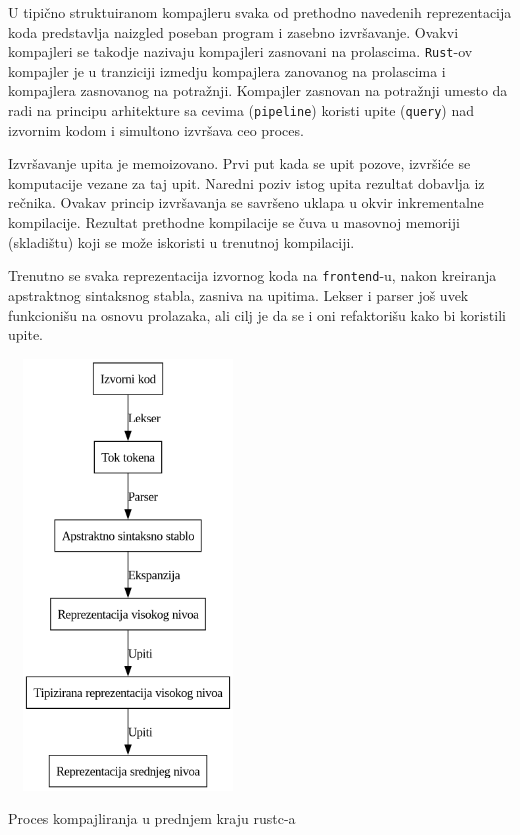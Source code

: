 \documentclass[11pt]{article}
\begin{document}
U tipično struktuiranom kompajleru svaka od prethodno navedenih reprezentacija koda predstavlja 
naizgled poseban program i zasebno izvršavanje. Ovakvi kompajleri se takodje nazivaju 
kompajleri zasnovani na prolascima. \verb|Rust|-ov kompajler je u tranziciji izmedju 
kompajlera zanovanog na prolascima i kompajlera zasnovanog na potražnji. Kompajler 
zasnovan na potražnji umesto da radi na principu arhitekture sa cevima (\verb|pipeline|)
koristi upite (\verb|query|) nad izvornim kodom i simultono izvršava ceo proces.

Izvršavanje upita je memoizovano. Prvi put kada se upit pozove, izvršiće se komputacije 
vezane za taj upit. Naredni poziv istog upita rezultat dobavlja iz rečnika.
Ovakav princip izvršavanja se savršeno uklapa u okvir inkrementalne kompilacije. 
Rezultat prethodne kompilacije se čuva u masovnoj memoriji (skladištu) koji se može iskoristi
u trenutnoj kompilaciji.

Trenutno se svaka reprezentacija izvornog koda na \verb|frontend|-u, 
nakon kreiranja apstraktnog sintaksnog stabla, zasniva na upitima. 
Lekser i parser još uvek funkcionišu na osnovu prolazaka, 
ali cilj je da se i oni refaktorišu kako bi koristili upite.

\begin{listing}[H]
\begin{center}
\includegraphics[width=2.5in, height=4.5in]{assets/images/compilation.png}
\end{center}
\caption{Proces kompajliranja u prednjem kraju rustc-a}
\label{lst:compiler}
\end{listing}
\end{document}
